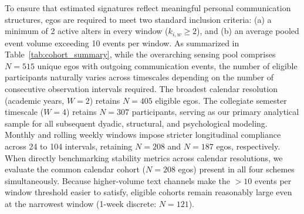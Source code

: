 \documentclass[11pt,letterpaper]{article}
\begin{document}
To ensure that estimated signatures reflect meaningful personal communication structures, egos are required to meet two standard inclusion criteria: (a) a minimum of 2 active alters in every window ($k_{i,w} \ge 2$), and (b) an average pooled event volume exceeding 10 events per window. As summarized in Table~\ref{tab:cohort_summary}, while the overarching sensing pool comprises $N = 515$ unique egos with outgoing communication events, the number of eligible participants naturally varies across timescales depending on the number of consecutive observation intervals required. The broadest calendar resolution (academic years, $W = 2$) retains $N = 405$ eligible egos. The collegiate semester timescale ($W = 4$) retains $N = 307$ participants, serving as our primary analytical sample for all subsequent dyadic, structural, and psychological modeling. Monthly and rolling weekly windows impose stricter longitudinal compliance across 24 to 104 intervals, retaining $N = 208$ and $N = 187$ egos, respectively. When directly benchmarking stability metrics across calendar resolutions, we evaluate the common calendar cohort ($N = 208$ egos) present in all four schemes simultaneously. Because higher-volume text channels make the $>10$ events per window threshold easier to satisfy, eligible cohorts remain reasonably large even at the narrowest window (1-week discrete: $N = 121$).

\begin{table}[htbp]
\centering
\caption{NetHealth Cohort Summary Across Temporal Window Definitions}
\label{tab:cohort_summary}
\small
{}
\end{table}
\end{document}
